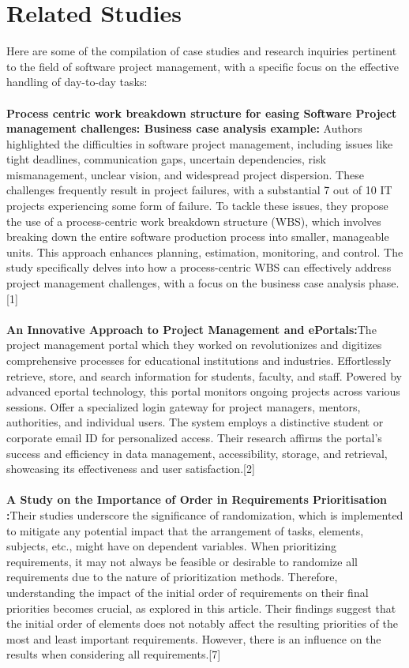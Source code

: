\documentclass{chart}
\begin{document}
\section{Related Studies}
Here are some of  the  compilation of case studies and research inquiries pertinent to the field of software project management, with a specific focus on the effective handling of day-to-day tasks: \\ \\
\textbf{Process centric work breakdown structure for easing Software Project management challenges: Business case analysis example:} Authors highlighted the difficulties in software project management, including issues like tight deadlines, communication gaps, uncertain dependencies, risk mismanagement, unclear vision, and widespread project dispersion. These challenges frequently result in project failures, with a substantial 7 out of 10 IT projects experiencing some form of failure. To tackle these issues, they propose the use of a process-centric work breakdown structure (WBS), which involves breaking down the entire software production process into smaller, manageable units. This approach enhances planning, estimation, monitoring, and control. The study specifically delves into how a process-centric WBS can effectively address project management challenges, with a focus on the business case analysis phase.[1]\\\\
\textbf{An Innovative Approach to Project Management and ePortals:}The project management portal which they worked on revolutionizes and digitizes comprehensive processes for educational institutions and industries. Effortlessly retrieve, store, and search information for students, faculty, and staff. Powered by advanced eportal technology, this portal monitors ongoing projects across various sessions.
Offer a specialized login gateway for project managers, mentors, authorities, and individual users. The system employs a distinctive student or corporate email ID for personalized access. Their research affirms the portal's success and efficiency in data management, accessibility, storage, and retrieval, showcasing its effectiveness and user satisfaction.[2]\\\\
\textbf{A Study on the Importance of Order in Requirements Prioritisation :}Their studies underscore the significance of randomization, which is implemented to mitigate any potential impact that the arrangement of tasks, elements, subjects, etc., might have on dependent variables. When prioritizing requirements, it may not always be feasible or desirable to randomize all requirements due to the nature of prioritization methods. Therefore, understanding the impact of the initial order of requirements on their final priorities becomes crucial, as explored in this article. Their findings suggest that the initial order of elements does not notably affect the resulting priorities of the most and least important requirements. However, there is an influence on the results when considering all requirements.[7]\\
\end{document}
